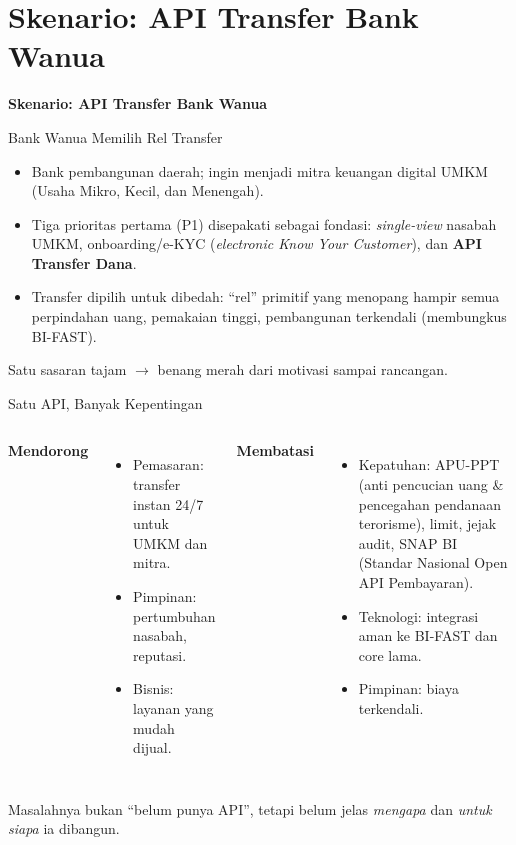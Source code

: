 \documentclass[aspectratio=169, table]{beamer}
\newcommand{\sectionframe}[1]{%
  \begin{frame}{\hfill}
    \centering
    \Huge{\textbf{#1}}
  \end{frame}
}
\newcommand{\takeaway}[1]{%
  \vspace{4pt}
  {\footnotesize #1}
}
\begin{document}
\section{Skenario: API Transfer Bank Wanua}
\sectionframe{Skenario: API Transfer Bank Wanua}

\begin{frame}{Bank Wanua Memilih Rel Transfer}
  \vspace{6pt}
  \begin{itemize}
    \item Bank pembangunan daerah; ingin menjadi mitra keuangan digital UMKM (Usaha Mikro, Kecil, dan Menengah).
    \item Tiga prioritas pertama (P1) disepakati sebagai fondasi:
          \emph{single-view} nasabah UMKM, onboarding/e-KYC (\emph{electronic Know Your Customer}), dan
          \textbf{API Transfer Dana}.
    \item Transfer dipilih untuk dibedah: ``rel'' primitif yang menopang hampir
          semua perpindahan uang, pemakaian tinggi, pembangunan terkendali
          (membungkus BI-FAST).
  \end{itemize}
  \takeaway{Satu sasaran tajam $\rightarrow$ benang merah dari motivasi sampai
  rancangan.}
\end{frame}

\begin{frame}{Satu API, Banyak Kepentingan}
  \vspace{4pt}
  \begin{columns}[T]
    \textbf{Mendorong}
    \begin{itemize}
      \item Pemasaran: transfer instan 24/7 untuk UMKM dan mitra.
      \item Pimpinan: pertumbuhan nasabah, reputasi.
      \item Bisnis: layanan yang mudah dijual.
    \end{itemize}
    \textbf{Membatasi}
    \begin{itemize}
      \item Kepatuhan: APU-PPT (anti pencucian uang \& pencegahan pendanaan terorisme), limit, jejak audit, SNAP BI (Standar Nasional Open API Pembayaran).
      \item Teknologi: integrasi aman ke BI-FAST dan core lama.
      \item Pimpinan: biaya terkendali.
    \end{itemize}
  \end{columns}
  \vspace{8pt}
  \takeaway{Masalahnya bukan ``belum punya API'', tetapi belum jelas
  \emph{mengapa} dan \emph{untuk siapa} ia dibangun.}
\end{frame}
\end{document}
